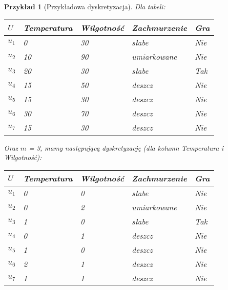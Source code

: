 \documentclass[magisterska]{pracamgr}
\theoremstyle{plain}
\newtheorem{przyklad}[thm]{Przykład}
\theoremstyle{definition}
\theoremstyle{remark}
\begin{document}
\begin{przyklad}[Przykładowa dyskretyzacja]
Dla tabeli:
\begin{center}
 \begin{tabular}{l || P{2.5cm} P{2.5cm} P{2.5cm} | P{1.5cm}}
  $U$     & Temperatura & Wilgotność & Zachmurzenie & Gra \\ 
  \hline
  $u_{1}$ & 0      & 30      & słabe          & Nie \\
  $u_{2}$ & 10     & 90      & umiarkowane    & Nie \\
  $u_{3}$ & 20     & 30      & słabe   	      & Tak \\
  $u_{4}$ & 15     & 50      & deszcz         & Nie \\
  $u_{5}$ & 15     & 30      & deszcz         & Nie \\
  $u_{6}$ & 30     & 70      & deszcz         & Nie \\
  $u_{7}$ & 15     & 30      & deszcz         & Nie \\
 \end{tabular}
\end{center}
Oraz $m$ = 3, mamy następującą dyskretyzację (dla kolumn Temperatura i Wilgotność):
\begin{center}
 \begin{tabular}{l || P{2.5cm} P{2.5cm} P{2.5cm} | P{1.5cm}}
  $U$     & Temperatura & Wilgotność & Zachmurzenie & Gra \\ 
  \hline
  $u_{1}$ & 0     & 0      & słabe          & Nie \\
  $u_{2}$ & 0     & 2      & umiarkowane    & Nie \\
  $u_{3}$ & 1     & 0      & słabe   	    & Tak \\
  $u_{4}$ & 0     & 1      & deszcz         & Nie \\
  $u_{5}$ & 1     & 0      & deszcz         & Nie \\
  $u_{6}$ & 2     & 1      & deszcz         & Nie \\
  $u_{7}$ & 1     & 1      & deszcz         & Nie \\
 \end{tabular}
\end{center}
\end{przyklad}
\end{document}
